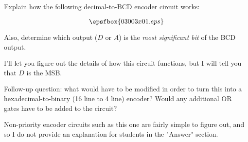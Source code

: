 

Explain how the following decimal-to-BCD encoder circuit works:

$$\epsfbox{03003x01.eps}$$

Also, determine which output ($D$ or $A$) is the {\it most significant bit} of the BCD output.







I'll let you figure out the details of how this circuit functions, but I will tell you that $D$ is the MSB.

\vskip 10pt

Follow-up question: what would have to be modified in order to turn this into a hexadecimal-to-binary (16 line to 4 line) encoder?  Would any additional OR gates have to be added to the circuit?







Non-priority encoder circuits such as this one are fairly simple to figure out, and so I do not provide an explanation for students in the "Answer" section.




